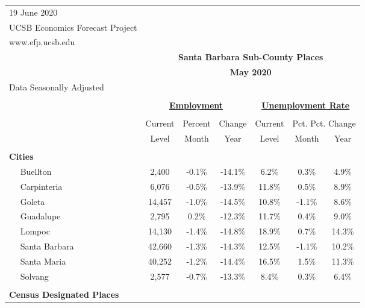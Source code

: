 \documentclass[12pt]{article}
\begin{document}
\begin{landscape}
\begin{table}
\begin{tabular}{|l|c|c|c||c|c|c|}
\multicolumn{1}{l}{\small 19 June 2020} & \multicolumn{6}{c}{} \\
\multicolumn{1}{l}{\small UCSB Economics Forecast Project} & \multicolumn{6}{c}{} \\
\multicolumn{1}{l}{\small www.efp.ucsb.edu} & \multicolumn{6}{c}{} \\
\multicolumn{1}{c}{} & \multicolumn{6}{c}{\large \textbf{Santa Barbara Sub-County Places}} \\
\multicolumn{1}{c}{} & \multicolumn{6}{c}{\large \textbf{May 2020}} \\
\multicolumn{7}{l}{\small Data Seasonally Adjusted} \\ \hline \hline
& \multicolumn{5}{c}{} & \\
& \multicolumn{3}{c}{\textbf{\underline{Employment}} } & \multicolumn{3}{c}{\textbf{\underline{Unemployment Rate}} } \vline \\
& \multicolumn{2}{c}{} & & \multicolumn{2}{c}{} & \\
& Current & \multicolumn{1}{r}{Percent} & Change & Current & \multicolumn{2}{c}{Pct. Pct. Change} \vline \\
& Level & Month & Year & Level & Month & Year \\ \hline
&&&&&& \\
\textbf{Cities} &&&&&& \\
$\quad$ Buellton & 2,400 & -0.1\% & -14.1\% & 6.2\% & 0.3\% & 4.9\% \\
$\quad$ Carpinteria & 6,076 & -0.5\% & -13.9\% & 11.8\% & 0.5\% & 8.9\% \\
$\quad$ Goleta & 14,457 & -1.0\% & -14.5\% & 10.8\% & -1.1\% & 8.6\% \\
$\quad$ Guadalupe & 2,795 & 0.2\% & -12.3\% & 11.7\% & 0.4\% & 9.0\% \\
$\quad$ Lompoc & 14,130 & -1.4\% & -14.8\% & 18.9\% & 0.7\% & 14.3\% \\
$\quad$ Santa Barbara & 42,660 & -1.3\% & -14.3\% & 12.5\% & -1.1\% & 10.2\% \\
$\quad$ Santa Maria & 40,252 & -1.2\% & -14.4\% & 16.5\% & 1.5\% & 11.3\% \\
$\quad$ Solvang & 2,577 & -0.7\% & -13.3\% & 8.4\% & 0.3\% & 6.4\% \\
&&&&&& \\
\textbf{Census Designated Places} &&&&&& \\

\end{tabular}
\end{table}
\end{landscape}
\end{document}
